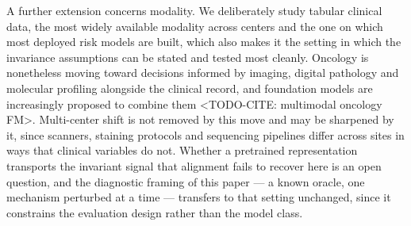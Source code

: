 A further extension concerns modality. We deliberately study tabular clinical
data, the most widely available modality across centers and the one on which
most deployed risk models are built, which also makes it the setting in which
the invariance assumptions can be stated and tested most cleanly. Oncology is
nonetheless moving toward decisions informed by imaging, digital pathology and
molecular profiling alongside the clinical record, and foundation models are
increasingly proposed to combine them <TODO-CITE: multimodal oncology FM>.
Multi-center shift is not removed by this move and may be sharpened by it, since
scanners, staining protocols and sequencing pipelines differ across sites in
ways that clinical variables do not. Whether a pretrained representation
transports the invariant signal that alignment fails to recover here is an open
question, and the diagnostic framing of this paper --- a known oracle, one
mechanism perturbed at a time --- transfers to that setting unchanged, since it
constrains the evaluation design rather than the model class.
